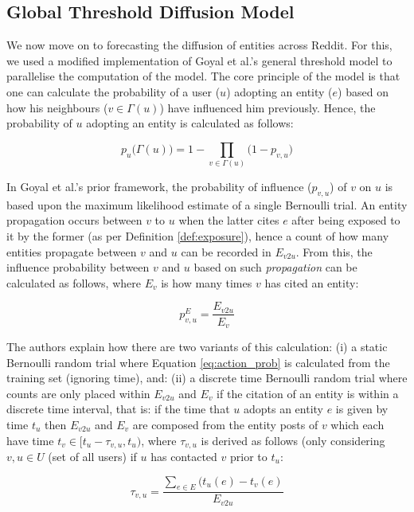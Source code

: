 \documentclass[10pt,journal,compsoc]{IEEEtran}
\begin{document}
\subsection{Global Threshold Diffusion Model}
We now move on to forecasting the diffusion of entities across Reddit.
For this, we used a modified implementation of Goyal et al.'s general threshold model \cite{goyal2010learning} to parallelise the computation of the model.
The core principle of the model is that one can calculate the probability of a user ($u$) adopting an entity ($e$) based on how his neighbours ($v \in \Gamma(u)$) have influenced him previously.
Hence, the probability of $u$ adopting an entity is calculated as follows:

\begin{equation}
\label{eq:joint_prob}
p_u\big(\Gamma(u)\big) = 1 - \displaystyle\prod_{v \in \Gamma(u)}\big(1 - p_{v,u}\big)
\end{equation}

In Goyal et al.'s prior framework, the probability of influence ($p_{v,u}$) of $v$ on $u$ is based upon the maximum likelihood estimate of a single Bernoulli trial.
An entity propagation occurs between $v$ to $u$ when the latter cites $e$ after being exposed to it by the former (as per Definition \ref{def:exposure}), hence a count of how many entities propagate between $v$ and $u$ can be recorded in $E_{v2u}$.
From this, the influence probability between $v$ and $u$ based on such \emph{propagation} can be calculated as follows, where $E_v$ is how many times $v$ has cited an entity:

\begin{equation}
\label{eq:action_prob}
p^{E}_{v,u} = \frac{E_{v2u}}{E_v}
\end{equation}

The authors explain how there are two variants of this calculation: (i) a static Bernoulli random trial where Equation \ref{eq:action_prob} is calculated from the training set (ignoring time), and: (ii) a discrete time Bernoulli random trial where counts are only placed within $E_{v2u}$ and $E_v$ if the citation of an entity is within a discrete time interval, that is: if the time that $u$ adopts an entity $e$ is given by time $t_u$ then $E_{v2u}$ and $E_v$ are composed from the entity posts of $v$ which each have time $t_v \in [t_u - \tau_{v,u}, t_u)$, where $\tau_{v,u}$ is derived as follows (only considering $v, u \in U$ (set of all users) if $u$ has contacted $v$ prior to $t_u$:

\begin{equation}
\tau_{v,u} = \frac{\displaystyle\sum_{e \in E} (t_u(e) - t_v(e)}{E_{v2u}}
\end{equation}
\end{document}
